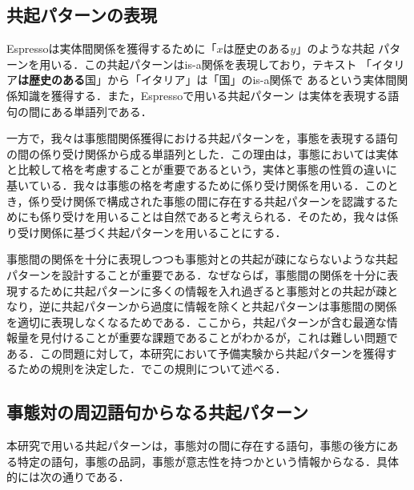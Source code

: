 \documentclass[japanese]{jnlp_1.4}
\begin{document}
\subsection{共起パターンの表現}
\label{ssec:pattern}

Espressoは実体間関係を獲得するために「$x$は歴史のある$y$」のような共起
パターンを用いる．この共起パターンはis-a関係を表現しており，テキスト
「イタリア\textbf{は歴史のある}国」から「イタリア」は「国」のis-a関係で
あるという実体間関係知識を獲得する．また，Espressoで用いる共起パターン
は実体を表現する語句の間にある単語列である．

一方で，我々は事態間関係獲得における共起パターンを，事態を表現する語句
の間の係り受け関係から成る単語列とした．この理由は，事態においては実体
と比較して格を考慮することが重要であるという，実体と事態の性質の違いに
基いている．我々は事態の格を考慮するために係り受け関係を用いる．このと
き，係り受け関係で構成された事態の間に存在する共起パターンを認識するた
めにも係り受けを用いることは自然であると考えられる．そのため，我々は係
り受け関係に基づく共起パターンを用いることにする．

事態間の関係を十分に表現しつつも事態対との共起が疎にならないような共起
パターンを設計することが重要である．なぜならば，事態間の関係を十分に表
現するために共起パターンに多くの情報を入れ過ぎると事態対との共起が疎と
なり，逆に共起パターンから過度に情報を除くと共起パターンは事態間の関係
を適切に表現しなくなるためである．ここから，共起パターンが含む最適な情
報量を見付けることが重要な課題であることがわかるが，これは難しい問題で
ある．この問題に対して，本研究において予備実験から共起パターンを獲得す
るための規則を決定した．でこの規則について述べる．

\subsection{事態対の周辺語句からなる共起パターン}
\label{ssec:pattern2}

本研究で用いる共起パターンは，事態対の間に存在する語句，事態の後方にあ
る特定の語句，事態の品詞，事態が意志性を持つかという情報からなる．具体
的には次の通りである．
\end{document}
